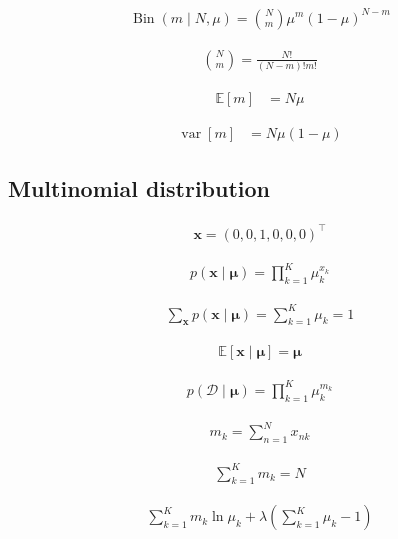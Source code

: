 \documentclass{article}
\begin{document}
\begin{align*}
\operatorname{Bin}(m \mid N, \mu)=\binom{N}{m} \mu^{m}(1-\mu)^{N-m}
\tag{3.9}
\end{align*}

\begin{align*}
\binom{N}{m}=\frac{N!}{(N-m)!m!}
\tag{3.10}
\end{align*}

\begin{align*}
\mathbb{E}[m] &= N \mu
\tag{3.11}
\end{align*}

\begin{align*}
\operatorname{var}[m] &= N \mu(1-\mu)
\tag{3.12}
\end{align*}

\subsection{Multinomial distribution}

\begin{align*}
\mathbf{x}=(0,0,1,0,0,0)^{\top}
\tag{3.13}
\end{align*}

\begin{align*}
p(\mathbf{x} \mid \boldsymbol{\mu})=\prod_{k=1}^{K} \mu_{k}^{x_{k}}
\tag{3.14}
\end{align*}

\begin{align*}
\sum_{\mathbf{x}} p(\mathbf{x} \mid \boldsymbol{\mu})=\sum_{k=1}^{K} \mu_{k}=1
\tag{3.15}
\end{align*}

\begin{align*}
\mathbb{E}[\mathbf{x} \mid \boldsymbol{\mu}] = \boldsymbol{\mu}
\tag{3.16}
\end{align*}

\begin{align*}
p(\mathcal{D} \mid \boldsymbol{\mu})=\prod_{k=1}^{K} \mu_{k}^{m_{k}}
\tag{3.17}
\end{align*}

\begin{align*}
m_{k}=\sum_{n=1}^{N} x_{n k}
\tag{3.18}
\end{align*}

\begin{align*}
\sum_{k=1}^{K} m_{k}=N
\tag{3.19}
\end{align*}

\begin{align*}
\sum_{k=1}^{K} m_{k} \ln \mu_{k}+\lambda\left(\sum_{k=1}^{K} \mu_{k}-1\right)
\tag{3.20}
\end{align*}
\end{document}
